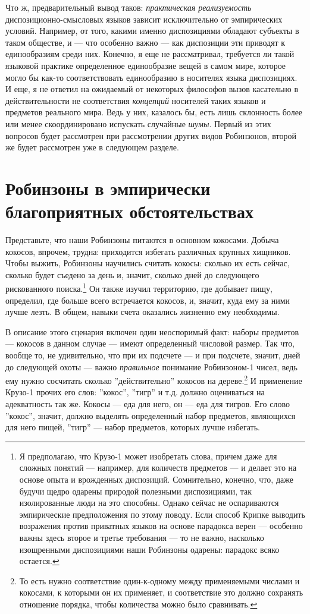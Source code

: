 \documentclass[11pt]{book}
\begin{document}
Что ж, предварительный вывод таков: \textit{практическая реализуемость} диспозиционно-смысловых языков зависит исключительно от эмпирических условий. Например, от того, какими именно диспозициями обладают субъекты в таком обществе, и --- что особенно важно --- как диспозиции эти приводят к единообразиям среди них. Конечно, я еще не рассматривал, требуется ли такой языковой практике определенное единообразие вещей в самом мире, которое могло бы как-то соответствовать единообразию в носителях языка диспозициях. И еще, я не ответил на ожидаемый от некоторых философов вызов касательно в действительности не соответствия \textit{концепций} носителей таких языков и предметов реального мира. Ведь у них, казалось бы, есть лишь склонность более или менее скоординировано испускать случайные \textit{шумы}. Первый из этих вопросов будет рассмотрен при рассмотрении других видов Робинзонов, второй же будет рассмотрен уже в следующем разделе.

\section{Робинзоны в эмпирически благоприятных обстоятельствах}

Представьте, что наши Робинзоны питаются в основном кокосами. Добыча кокосов, впрочем, трудна: приходится избегать различных крупных хищников. Чтобы выжить, Робинзоны научились считать кокосы: сколько их есть сейчас, сколько будет съедено за день и, значит, сколько дней до следующего рискованного поиска.\footnote{Я предполагаю, что Крузо-1 может изобретать слова, причем даже для сложных понятий --- например, для количеств предметов --- и делает это на основе опыта и врожденных диспозиций. Сомнительно, конечно, что, даже будучи щедро одарены природой полезными диспозициями, так изолированные люди на это способны. Однако сейчас не оспариваются эмпирические предположения по этому поводу. Если способ Крипке выводить возражения против приватных языков на основе парадокса верен --- особенно важны здесь второе и третье требования --- то не важно, насколько изощренными диспозициями наши Робинзоны одарены: парадокс всяко остается.} Он также изучил территорию, где добывает пищу, определил, где больше всего встречается кокосов, и, значит, куда ему за ними лучше лезть. В общем, навыки счета оказались жизненно ему необходимы.

В описание этого сценария включен один неоспоримый факт: наборы предметов --- кокосов в данном случае --- имеют определенный числовой размер. Так что, вообще то, не удивительно, что при их подсчете --- и при подсчете, значит, дней до следующей охоты --- важно \textit{правильное} понимание Робинзоном-1 чисел, ведь ему нужно сосчитать сколько ''действительно'' кокосов на дереве.\footnote{То есть нужно соответствие один-к-одному между применяемыми числами и кокосами, к которыми он их применяет, и соответствие это должно сохранять отношение порядка, чтобы количества можно было сравнивать.} И применение Крузо-1 прочих его слов: ''кокос'', ''тигр'' и т.д. должно оцениваться на адекватность так же. Кокосы --- еда для него, он --- еда для тигров. Его слово ''кокос'', значит, должно выделять определенный набор предметов, являющихся для него пищей, ''тигр'' --- набор предметов, которых лучше избегать.
\end{document}
